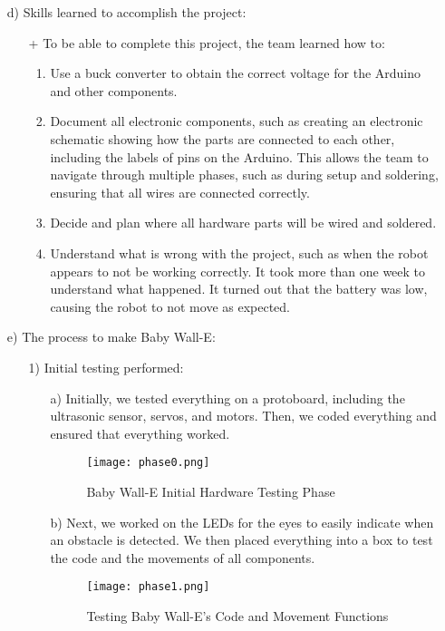 \documentclass[12pt]{article}
\begin{document}
\begin{itemize}
\begin{itemize}
        \item[d)] Skills learned to accomplish the project:
            \begin{itemize}
                \item[+] To be able to complete this project, the team learned how to:
                \begin{enumerate}
                    \item Use a buck converter to obtain the correct voltage for the Arduino and other components.
                    \item Document all electronic components, such as creating an electronic schematic showing how the parts are connected to each other, including the labels of pins on the Arduino. This allows the team to navigate through multiple phases, such as during setup and soldering, ensuring that all wires are connected correctly.
                    \item Decide and plan where all hardware parts will be wired and soldered.
                    \item Understand what is wrong with the project, such as when the robot appears to not be working correctly. It took more than one week to understand what happened. It turned out that the battery was low, causing the robot to not move as expected.
                \end{enumerate}
            \end{itemize}

        
        \item[e)] The process to make Baby Wall-E:
        \begin{itemize}
            \item[1)] Initial testing performed:
            \begin{enumerate}
                \item[a)] Initially, we tested everything on a protoboard, including the ultrasonic sensor, servos, and motors. Then, we coded everything and ensured that everything worked.
                \begin{figure}[H]
                    \centering
                    \texttt{[image: phase0.png]}
                    \caption{Baby Wall-E Initial Hardware Testing Phase}
                    \label{fig:phase0}
                \end{figure}
                \item[b)] Next, we worked on the LEDs for the eyes to easily indicate when an obstacle is detected. We then placed everything into a box to test the code and the movements of all components.
                \begin{figure}[H]
                    \centering
                    \texttt{[image: phase1.png]}
                    \caption{Testing Baby Wall-E's Code and Movement Functions}
                    \label{fig:phase1}
                \end{figure}
            

\end{enumerate}
\end{itemize}
\end{itemize}
\end{itemize}
\end{document}
